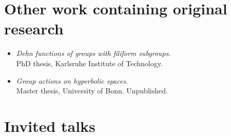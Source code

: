 \documentclass[a4paper,11pt]{article} %
\begin{document}
\section{Other work containing original research}

\begin{itemize}
    \item \emph{Dehn functions of groups with filiform subgroups}. \\
    PhD thesis, Karlsruhe Institute of Technology. 

    \item \emph{Group actions on hyperbolic spaces}. \\
    Master thesis, University of Bonn. Unpublished. 
\end{itemize}


\section{Invited talks}

\end{document}
